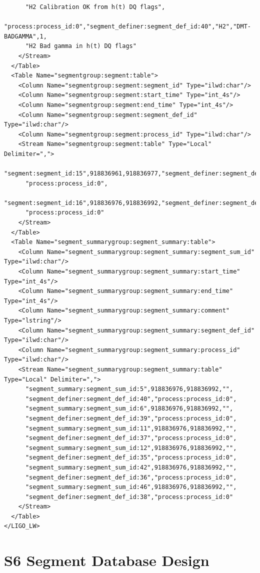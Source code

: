 {\begin{verbatim}
      "H2 Calibration OK from h(t) DQ flags",
      "process:process_id:0","segment_definer:segment_def_id:40","H2","DMT-BADGAMMA",1,
      "H2 Bad gamma in h(t) DQ flags"
    </Stream>
  </Table>
  <Table Name="segmentgroup:segment:table">
    <Column Name="segmentgroup:segment:segment_id" Type="ilwd:char"/>
    <Column Name="segmentgroup:segment:start_time" Type="int_4s"/>
    <Column Name="segmentgroup:segment:end_time" Type="int_4s"/>
    <Column Name="segmentgroup:segment:segment_def_id" Type="ilwd:char"/>
    <Column Name="segmentgroup:segment:process_id" Type="ilwd:char"/>
    <Stream Name="segmentgroup:segment:table" Type="Local" Delimiter=",">
      "segment:segment_id:15",918836961,918836977,"segment_definer:segment_def_id:35",
      "process:process_id:0",
      "segment:segment_id:16",918836976,918836992,"segment_definer:segment_def_id:37",
      "process:process_id:0"
    </Stream>
  </Table>
  <Table Name="segment_summarygroup:segment_summary:table">
    <Column Name="segment_summarygroup:segment_summary:segment_sum_id" Type="ilwd:char"/>
    <Column Name="segment_summarygroup:segment_summary:start_time" Type="int_4s"/>
    <Column Name="segment_summarygroup:segment_summary:end_time" Type="int_4s"/>
    <Column Name="segment_summarygroup:segment_summary:comment" Type="lstring"/>
    <Column Name="segment_summarygroup:segment_summary:segment_def_id" Type="ilwd:char"/>
    <Column Name="segment_summarygroup:segment_summary:process_id" Type="ilwd:char"/>
    <Stream Name="segment_summarygroup:segment_summary:table" Type="Local" Delimiter=",">
      "segment_summary:segment_sum_id:5",918836976,918836992,"",
      "segment_definer:segment_def_id:40","process:process_id:0",
      "segment_summary:segment_sum_id:6",918836976,918836992,"",
      "segment_definer:segment_def_id:39","process:process_id:0",
      "segment_summary:segment_sum_id:11",918836976,918836992,"",
      "segment_definer:segment_def_id:37","process:process_id:0",
      "segment_summary:segment_sum_id:12",918836976,918836992,"",
      "segment_definer:segment_def_id:35","process:process_id:0",
      "segment_summary:segment_sum_id:42",918836976,918836992,"",
      "segment_definer:segment_def_id:36","process:process_id:0",
      "segment_summary:segment_sum_id:46",918836976,918836992,"",
      "segment_definer:segment_def_id:38","process:process_id:0"
    </Stream>
  </Table>
</LIGO_LW>
\end{verbatim}
}

\section{S6 Segment Database Design}
\label{sec:segment_database_design}

